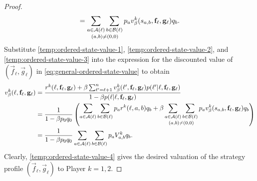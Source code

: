 \begin{proof}
\begin{equation}
                = \mathop{\displaystyle\sum_{a \in \mathcal{A}(\ell)} \displaystyle\sum_{b \in \mathcal{B}(\ell)}}_{(a, b) \neq (0, 0)} p_a v^k_\beta(s_{a, b}, \mathbf{f}_\ell, \mathbf{g}_\ell) q_b.
        \end{equation}
        Substitute \eqref{temp:ordered-state-value-1}, \eqref{temp:ordered-state-value-2}, and \eqref{temp:ordered-state-value-3} into the expression for the discounted value of $(\vec{f}_\ell, \vec{g}_\ell)$ in \eqref{eq:general-ordered-state-value} to obtain
        \begin{equation}  \label{temp:ordered-state-value-4}
        \begin{split}
            v^k_\beta(\ell, \vec{f}_\ell, \vec{g}_\ell)
                &= \frac{r^k(\ell, \vec{f}_\ell, \vec{g}_\ell) + \beta \sum_{\ell' = \ell + 1}^n v_\beta^k(\ell', \vec{f}_\ell, \vec{g}_\ell) p(\ell' | \ell, \vec{f}_\ell, \vec{g}_\ell)}{1 - \beta p(\ell | \ell, \vec{f}_\ell, \vec{g}_\ell)} \\
                &= \frac{1}{1 - \beta p_0 q_0} \left(\vcenter{\hbox{$\displaystyle\sum_{a \in \calA(\ell)} \displaystyle\sum_{b \in \calB(\ell)} p_a r^k(\ell, a, b) q_b + \beta \mathop{\displaystyle\sum_{a \in \calA(\ell)} \displaystyle\sum_{b \in \calB(\ell)}}_{(a, b) \neq (0, 0)} p_a v^k_\beta(s_{a, b}, \vec{f}_\ell, \vec{g}_\ell) q_b$}}\right) \\
                &= \frac{1}{1 - \beta p_0 q_0} \sum_{a \in \calA(\ell)} \sum_{b \in \calB(\ell)} p_a V^k_{a, b} q_b.
        \end{split}
        \end{equation}
        Clearly, \eqref{temp:ordered-state-value-4} gives the desired valuation of the strategy profile $(\vec{f}_\ell, \vec{g}_\ell)$ to Player $k = 1, 2$.
    \end{proof}

